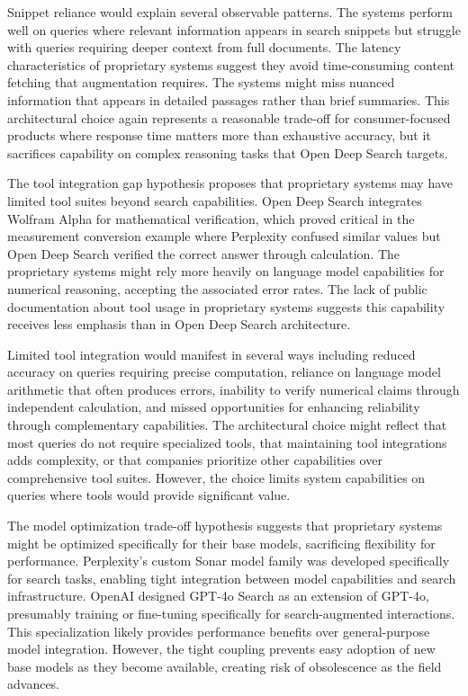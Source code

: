 Snippet reliance would explain several observable patterns. The systems perform well on queries where relevant information appears in search snippets but struggle with queries requiring deeper context from full documents. The latency characteristics of proprietary systems suggest they avoid time-consuming content fetching that augmentation requires. The systems might miss nuanced information that appears in detailed passages rather than brief summaries. This architectural choice again represents a reasonable trade-off for consumer-focused products where response time matters more than exhaustive accuracy, but it sacrifices capability on complex reasoning tasks that Open Deep Search targets.

The tool integration gap hypothesis proposes that proprietary systems may have limited tool suites beyond search capabilities. Open Deep Search integrates Wolfram Alpha for mathematical verification, which proved critical in the measurement conversion example where Perplexity confused similar values but Open Deep Search verified the correct answer through calculation. The proprietary systems might rely more heavily on language model capabilities for numerical reasoning, accepting the associated error rates. The lack of public documentation about tool usage in proprietary systems suggests this capability receives less emphasis than in Open Deep Search architecture.

Limited tool integration would manifest in several ways including reduced accuracy on queries requiring precise computation, reliance on language model arithmetic that often produces errors, inability to verify numerical claims through independent calculation, and missed opportunities for enhancing reliability through complementary capabilities. The architectural choice might reflect that most queries do not require specialized tools, that maintaining tool integrations adds complexity, or that companies prioritize other capabilities over comprehensive tool suites. However, the choice limits system capabilities on queries where tools would provide significant value.

The model optimization trade-off hypothesis suggests that proprietary systems might be optimized specifically for their base models, sacrificing flexibility for performance. Perplexity's custom Sonar model family was developed specifically for search tasks, enabling tight integration between model capabilities and search infrastructure. OpenAI designed GPT-4o Search as an extension of GPT-4o, presumably training or fine-tuning specifically for search-augmented interactions. This specialization likely provides performance benefits over general-purpose model integration. However, the tight coupling prevents easy adoption of new base models as they become available, creating risk of obsolescence as the field advances.

